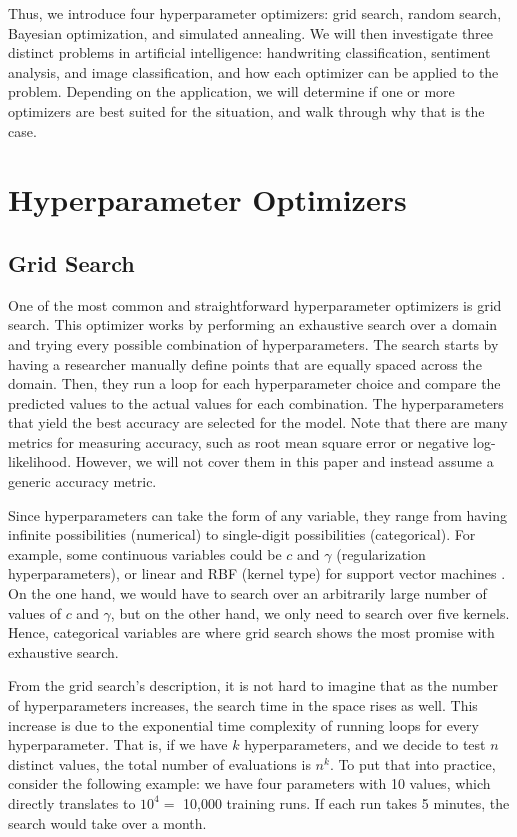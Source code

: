 \documentclass[stu,12pt,floatsintext]{apa7}
\begin{document}
Thus, we introduce four hyperparameter optimizers: grid search, random search, Bayesian optimization, and simulated annealing. We will then investigate three distinct problems in artificial intelligence: handwriting classification, sentiment analysis, and image classification, and how each optimizer can be applied to the problem. Depending on the application, we will determine if one or more optimizers are best suited for the situation, and walk through why that is the case. 

\section{Hyperparameter Optimizers}

\subsection{Grid Search}

One of the most common and straightforward hyperparameter optimizers is grid search. This optimizer works by performing an exhaustive search over a domain and trying every possible combination of hyperparameters. The search starts by having a researcher manually define points that are equally spaced across the domain. Then, they run a loop for each hyperparameter choice and compare the predicted values to the actual values for each combination. The hyperparameters that yield the best accuracy are selected for the model. Note that there are many metrics for measuring accuracy, such as root mean square error or negative log-likelihood. However, we will not cover them in this paper and instead assume a generic accuracy metric.

Since hyperparameters can take the form of any variable, they range from having infinite possibilities (numerical) to single-digit possibilities (categorical). For example, some continuous variables could be \(c\) and \(\gamma\) (regularization hyperparameters), or linear and RBF (kernel type) for support vector machines \parencite{scikitlearn_2019_sklearnsvmsvc}. On the one hand, we would have to search over an arbitrarily large number of values of \(c\) and \(\gamma\), but on the other hand, we only need to search over five kernels. Hence, categorical variables are where grid search shows the most promise with exhaustive search. 

From the grid search's description, it is not hard to imagine that as the number of hyperparameters increases, the search time in the space rises as well. This increase is due to the exponential time complexity of running loops for every hyperparameter. That is, if we have \(k\) hyperparameters, and we decide to test \(n\) distinct values, the total number of evaluations is \(n^{k}\). To put that into practice, consider the following example: we have four parameters with 10 values, which directly translates to \(10^{4} =\) 10,000 training runs. If each run takes 5 minutes, the search would take over a month. 
\end{document}
